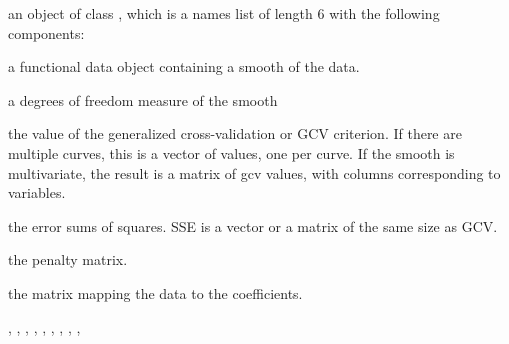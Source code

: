 \documentclass{article}
\begin{document}
\begin{Value}
an object of class , which is a names list of length 6
with the following components: 

\begin{ldescription}
\item[\code{fd}] a functional data object containing a smooth of the data. 

\item[\code{df}] a degrees of freedom measure of the smooth

\item[\code{gcv}] the value of the generalized cross-validation or GCV criterion.  If
there are multiple curves, this is a vector of values, one per
curve.  If the smooth is multivariate, the result is a matrix of gcv
values, with columns corresponding to variables.


\item[\code{SSE}] the error sums of squares.  SSE is a vector or a matrix of the same
size as GCV. 

\item[\code{penmat}] the penalty matrix.

\item[\code{y2cMap}] the matrix mapping the data to the coefficients.

\end{ldescription}
\end{Value}
\begin{SeeAlso}\relax
{}, , 
, , 
, , 
, , 
, 
\end{SeeAlso}
\end{document}
